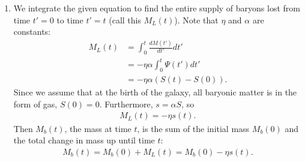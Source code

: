 \documentclass[11pt,letterpaper]{article}
\begin{document}
\begin{enumerate}[label=(\roman*)]
    \item We integrate the given equation to find the entire supply of baryons lost from time $t'=0$ to time $t'=t$ (call this $M_L(t)$). Note that $\eta$ and $\alpha$ are constants:
    \begin{align}
        M_L(t) &= \int_0^t \frac{dM(t')}{dt'}dt' \\
        &= -\eta\alpha\int_0^t \Psi(t')dt' \\
        &= -\eta\alpha(S(t) - S(0)).
    \end{align}
    Since we assume that at the birth of the galaxy, all baryonic matter is in the form of gas, $S(0) = 0$. Furthermore, $s = \alpha S$, so 
    \begin{align}
        M_L(t) = -\eta s(t).
    \end{align}
    Then $M_b(t)$, the mass at time $t$, is the sum of the initial mass $M_b(0)$ and the total change in mass up until time $t$:
    \begin{align}
        M_b(t) = M_b(0) + M_L(t) = M_b(0) - \eta s(t).
    \end{align}


\end{enumerate}
\end{document}
